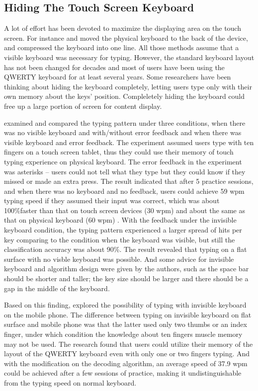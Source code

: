\documentclass[11pt]{article}
\begin{document}
\subsection{Hiding The Touch Screen Keyboard}
A lot of effort has been devoted to maximize the displaying area on the touch screen. For instance \citet{scott2010reartype} and \citet{backkey2012} moved the physical keyboard to the back of the device, and \citet{10.1145/2047196.2047257} compressed the keyboard into one line. All those methods assume that a visible keyboard was necessary for typing. However, the standard keyboard layout has not been changed for decades and most of users have been using the QWERTY keyboard for at least several years. Some researchers have been thinking about hiding the keyboard completely, letting users type only with their own memory about the keys' position. Compleletely hiding the keyboard could free up a large portion of screen for content display.

\citet{10.1145/1978942.1979301} examined and compared the typing pattern under three conditions, when there was no visible keyboard and with/without error feedback and when there was visible keyboard and error feedback. The experiment assumed users type with ten fingers on a touch screen tablet, thus they could use their memory of touch typing experience on physical keyboard. The error feedback in the experiment was asterisks -- users could not tell what they type but they could know if they missed or made an extra press. The result indicated that after 5 practice sessions, and when there was no keyboard and no feedback, users could achieve 59 wpm typing speed if they assumed their input was correct, which was about 100\%faster than that on touch screen devices (30 wpm) and about the same as that on physical keyboard (60 wpm) \citep{10.1145/3173574.3174220}. With the feedback under the invisible keyboard condition, the typing pattern experienced a larger spread of hits per key comparing to the condition when the keyboard was visible, but still the classification accuracy was about 90\%. The result revealed that typing on a flat surface with no visble keyboard was possible. And some advice for invisible keyboard and algorithm design were given by the authors, such as the space bar should be shorter and taller; the key size should be larger and there should be a gap in the middle of the keyboard.

Based on this finding, \citet{10.1145/3173574.3174013} explored the possibility of typing with invisible keyboard on the mobile phone. The difference between typing on invisible keyboard on flat surface and mobile phone was that the latter used only two thumbs or an index finger, under which condition the knowledge about ten fingers muscle memory may not be used. The research found that users could utilize their memory of the layout of the QWERTY keyboard even with only one or two fingers typing. And with the modification on the decoding algorithm, an average speed of 37.9 wpm could be achieved after a few sessions of practice, making it undistinguishable from the typing speed on normal keyboard.
\end{document}
